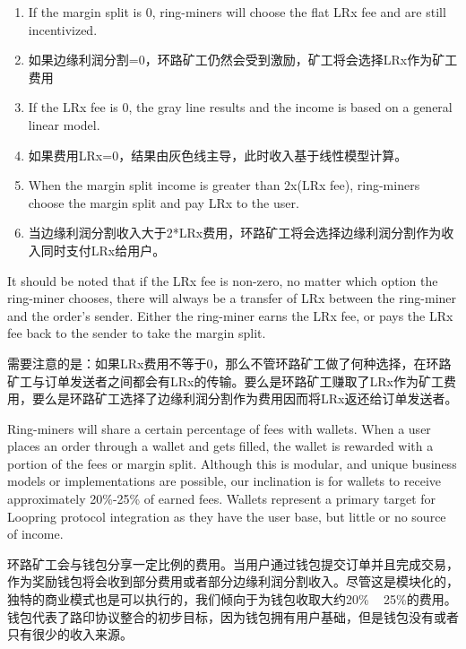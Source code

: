 \documentclass[UTF8,nofonts]{ctexart}
\begin{document}
\begin{multicols}{2}
\begin{enumerate}
	\item If the margin split is 0, ring-miners will choose the flat LRx fee and are still incentivized. 
	\item 如果边缘利润分割=0，环路矿工仍然会受到激励，矿工将会选择LRx作为矿工费用

	\item If the LRx fee is 0, the gray line results and the income is based on a general linear model.
	\item 如果费用LRx=0，结果由灰色线主导，此时收入基于线性模型计算。

	\item When the margin split income is greater than 2x(LRx fee), ring-miners choose the margin split and pay LRx to the user.
	\item 当边缘利润分割收入大于2*LRx费用，环路矿工将会选择边缘利润分割作为收入同时支付LRx给用户。

\end{enumerate}

It should be noted that if the LRx fee is non-zero, no matter which option the ring-miner chooses, there will always be a transfer of LRx between the ring-miner and the order's sender. Either the ring-miner earns the LRx fee, or pays the LRx fee back to the sender to take the margin split.

需要注意的是：如果LRx费用不等于0，那么不管环路矿工做了何种选择，在环路矿工与订单发送者之间都会有LRx的传输。要么是环路矿工赚取了LRx作为矿工费用，要么是环路矿工选择了边缘利润分割作为费用因而将LRx返还给订单发送者。


Ring-miners will share a certain percentage of fees with wallets. When a user places an order through a wallet and gets filled, the wallet is rewarded with a portion of the fees or margin split. Although this is modular, and unique business models or implementations are possible, our inclination is for wallets to receive approximately 20\%-25\% of earned fees. Wallets represent a primary target for Loopring protocol integration as they have the user base, but little or no source of income.

环路矿工会与钱包分享一定比例的费用。当用户通过钱包提交订单并且完成交易，作为奖励钱包将会收到部分费用或者部分边缘利润分割收入。尽管这是模块化的，独特的商业模式也是可以执行的，我们倾向于为钱包收取大约20\% ~ 25\%的费用。钱包代表了路印协议整合的初步目标，因为钱包拥有用户基础，但是钱包没有或者只有很少的收入来源。



\end{multicols}
\end{document}

